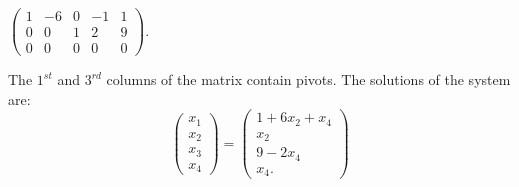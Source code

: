 \documentclass{ximera}
\begin{document}
\begin{exercise} \label{c2.3.7c}
$\left(\begin{array}{rrrr|r}
 1  & -6 & 0 & -1 & 1\\
 0  &  0 & 1 & 2 & 9 \\
 0  &  0 & 0 & 0 & 0
       \end{array}\right)$.
  
   \begin{solution}
\ans The $1^{st}$ and $3^{rd}$ columns of the matrix
contain pivots.  The solutions of the system are:
\[
\left(\begin{array}{r} x_1 \\ x_2 \\ x_3\\ x_4\end{array} \right)
= \left(\begin{array}{c} 1 + 6x_2 + x_4\\ x_2 \\ 9 - 2x_4 \\x_4. \end{array} \right)
\]


\end{solution}    
   \end{exercise}
   
\end{document}
